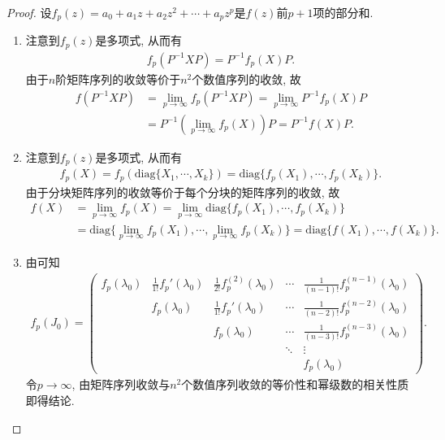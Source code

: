 \documentclass[../../main.tex]{subfiles}%
\begin{document}
\begin{proof}
设\(f_p(z)=a_0 + a_1z + a_2z^2 + \cdots + a_pz^p\)是\(f(z)\)前\(p + 1\)项的部分和.
\begin{enumerate}[(1)]
\item 注意到\(f_p(z)\)是多项式, 从而有
\begin{align*}
f_p(P^{-1}XP) = P^{-1}f_p(X)P.
\end{align*}
由于\(n\)阶矩阵序列的收敛等价于\(n^2\)个数值序列的收敛, 故
\begin{align*}
f(P^{-1}XP) &= \lim_{p \to \infty} f_p(P^{-1}XP) = \lim_{p \to \infty} P^{-1}f_p(X)P \\
&= P^{-1}(\lim_{p \to \infty} f_p(X))P = P^{-1}f(X)P.
\end{align*}

\item  注意到\(f_p(z)\)是多项式, 从而有
\begin{align*}
f_p(X) = f_p(\mathrm{diag}\{X_1,\cdots,X_k\}) = \mathrm{diag}\{f_p(X_1),\cdots,f_p(X_k)\}.
\end{align*}
由于分块矩阵序列的收敛等价于每个分块的矩阵序列的收敛, 故
\begin{align*}
f(X) &= \lim_{p \to \infty} f_p(X) = \lim_{p \to \infty} \mathrm{diag}\{f_p(X_1),\cdots,f_p(X_k)\} \\
&= \mathrm{diag}\{\lim_{p \to \infty} f_p(X_1),\cdots,\lim_{p \to \infty} f_p(X_k)\} = \mathrm{diag}\{f(X_1),\cdots,f(X_k)\}.
\end{align*}

\item  由可知
\begin{align*}
f_p(J_0)= \begin{pmatrix}
f_p(\lambda_0) & \frac{1}{1!}f_p'(\lambda_0) & \frac{1}{2!}f_p^{(2)}(\lambda_0) & \cdots & \frac{1}{(n - 1)!}f_p^{(n - 1)}(\lambda_0) \\
 & f_p(\lambda_0) & \frac{1}{1!}f_p'(\lambda_0) & \cdots & \frac{1}{(n - 2)!}f_p^{(n - 2)}(\lambda_0) \\
 & & f_p(\lambda_0) & \cdots & \frac{1}{(n - 3)!}f_p^{(n - 3)}(\lambda_0) \\
 & & & \ddots & \vdots \\
 & & & & f_p(\lambda_0)
\end{pmatrix}. 
\end{align*}
令\(p \to \infty\), 由矩阵序列收敛与\(n^2\)个数值序列收敛的等价性和幂级数的相关性质即得结论.
\end{enumerate}
\end{proof}
\end{document}
